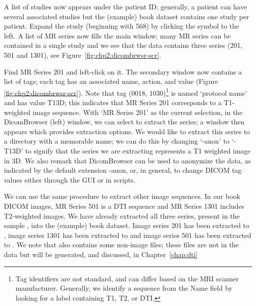 A list of studies now appears under the patient ID; generally, a
patient can have several associated studies but the (example) book dataset
contains one study per patient. Expand the study (beginning with 568)
by clicking the symbol to the left. A list of MR series now fills the
main window; many MR series can be contained in a single study and we
see that the \emp{\erniedicom} data contains three series (201, 501 and 1301), 
see Figure~\ref{fig:chp2:dicombrwsr-scr}.

Find MR Series 201 and left-click on it. The secondary window now
contains a list of tags; each tag has an associated name, action, and
value (Figure \ref{fig:chp2:dicombrwsr-scr}). Note that tag (0018,
1030)\footnote{Tag identifiers are not standard, and can differ based
  on the MRI scanner manufacturer.  Generally, we identify a
  sequence from the Name field by looking for a label containing T1,
  T2, or DTI.} is named `protocol name' and has value T13D; this
indicates that MR Series 201 corresponds to a T1-weighted image
sequence. With `MR Series 201' as the current selection, in the DicomBrowser 
(left) window, we can select  to extract the 
series; a window then appears which provides extraction options.  We would 
like to extract this series to a directory with a memorable name; we can 
do this by changing `-anon' to `-T13D' to signify that the series we are 
extracting represents a T1 weighted image in 3D.  %
%
We also remark that DicomBrowser can be used to anonymize the data, as
indicated by the default extension {-anon}, or, in general, to change
DICOM tag values either through the GUI or in scripts. 

We can use the same procedure to extract other image sequences. In our
book DICOM images, MR Series 501 is a DTI sequence and MR Series 1301
includes T2-weighted images.  We have already extracted all three series, 
present in the sample , into the (example) book dataset.  Image series 
201 has been extracted to , image series 1301 has been 
extracted to  and image series 501 has been extracted to    
.  We note that  also contains 
some non-image files; these files are not in the  data but 
will be generated, and discussed, in Chapter~\ref{chap:dti}   
%


